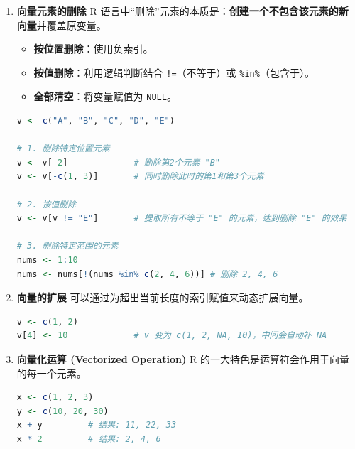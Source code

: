 \begin{enumerate}[label=\arabic*., leftmargin=2em]
    \item \textbf{向量元素的删除}
    R 语言中“删除”元素的本质是：\textbf{创建一个不包含该元素的新向量}并覆盖原变量。
    \begin{itemize}
        \item \textbf{按位置删除}：使用负索引。
        \item \textbf{按值删除}：利用逻辑判断结合 \texttt{!=}（不等于）或 \texttt{\%in\%}（包含于）。
        \item \textbf{全部清空}：将变量赋值为 \texttt{NULL}。
    \end{itemize}
\begin{lstlisting}[language=R]
v <- c("A", "B", "C", "D", "E")

# 1. 删除特定位置元素
v <- v[-2]             # 删除第2个元素 "B"
v <- v[-c(1, 3)]       # 同时删除此时的第1和第3个元素

# 2. 按值删除
v <- v[v != "E"]       # 提取所有不等于 "E" 的元素，达到删除 "E" 的效果

# 3. 删除特定范围的元素
nums <- 1:10
nums <- nums[!(nums %in% c(2, 4, 6))] # 删除 2, 4, 6
\end{lstlisting}

    \item \textbf{向量的扩展}
    可以通过为超出当前长度的索引赋值来动态扩展向量。
\begin{lstlisting}[language=R]
v <- c(1, 2)
v[4] <- 10             # v 变为 c(1, 2, NA, 10)，中间会自动补 NA
\end{lstlisting}
    \item \textbf{向量化运算 (Vectorized Operation)}
    R 的一大特色是运算符会作用于向量的每一个元素。
\begin{lstlisting}[language=R]
x <- c(1, 2, 3)
y <- c(10, 20, 30)
x + y         # 结果: 11, 22, 33
x * 2         # 结果: 2, 4, 6
\end{lstlisting}
\end{enumerate}



